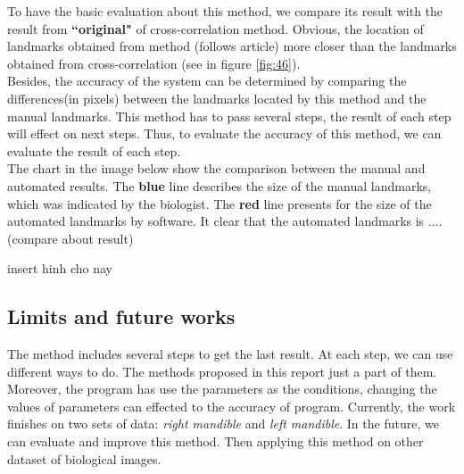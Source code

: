 To have the basic evaluation about this method, we compare its result with the result from \textbf{``original"} of cross-correlation method. Obvious, the location of landmarks obtained from method (follows article) more closer than the landmarks obtained from cross-correlation (see in figure \ref{fig:46}).\\
Besides, the accuracy of the system can be determined by comparing the differences(in pixels) between the landmarks located by this method and the manual landmarks. This method has to pass several steps, the result of each step will effect on next steps. Thus, to evaluate the accuracy of this method, we can evaluate the result of each step.\\
The chart in the image below show the comparison between the manual and automated results. The \textbf{blue} line describes the size of the manual landmarks, which was indicated by the biologist. The \textbf{red} line presents for the size of the automated landmarks by software. It clear that the automated landmarks is ....(compare about result)

insert hinh cho nay

\subsection{Limits and future works}
The method includes several steps to get the last result. At each step, we can use different ways to do. The methods proposed in this report just a part of them. Moreover, the program has use the parameters as the conditions, changing the values of parameters can effected to the accuracy of program.
Currently, the work finishes on two sets of data: \textit{right mandible} and \textit{left mandible}. In the future, we can evaluate and improve this method. Then applying this method on other dataset of biological images.